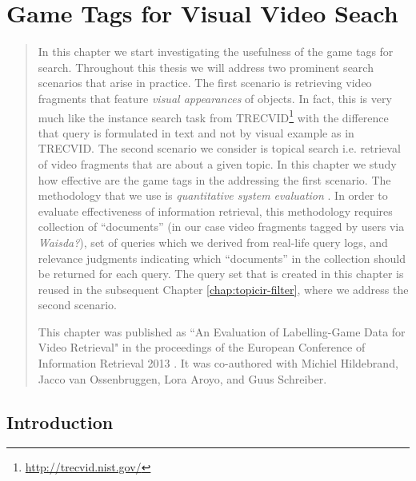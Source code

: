 \chapter{Game Tags for Visual Video Seach}\label{chap:ecir}

\begin{quotation}
\noindent
In this chapter we start investigating the usefulness of the game tags for search. Throughout this thesis we will address two prominent search scenarios that arise in practice. The first scenario is retrieving video fragments that feature \textit{visual appearances} of objects. In fact, this is very much like the instance search task from TRECVID\footnote{\url{http://trecvid.nist.gov/}} with the difference that query is formulated in text and not by visual example as in TRECVID. The second scenario we consider is topical search i.e. retrieval of video fragments that are about a given topic. In this chapter we study how effective are the game tags in the addressing the first scenario. The methodology that we use is \textit{quantitative system evaluation} \cite{vorhees}. In order to evaluate effectiveness of information retrieval, this methodology requires collection of ``documents'' (in our case video fragments tagged by users via \textit{Waisda?}), set of queries which we derived from real-life query logs, and relevance judgments  indicating which ``documents'' in the collection should be returned for each query. The query set that is created in this chapter is reused in the subsequent Chapter \ref{chap:topicir-filter}, where we address the second scenario.

This chapter was published as ``An Evaluation of Labelling-Game Data for Video Retrieval" in the proceedings of the European Conference of Information Retrieval 2013 \cite{ecir}. It was co-authored with Michiel Hildebrand, Jacco van Ossenbruggen, Lora Aroyo, and Guus Schreiber.
\end{quotation}

\section{Introduction}\label{sec:intro}

